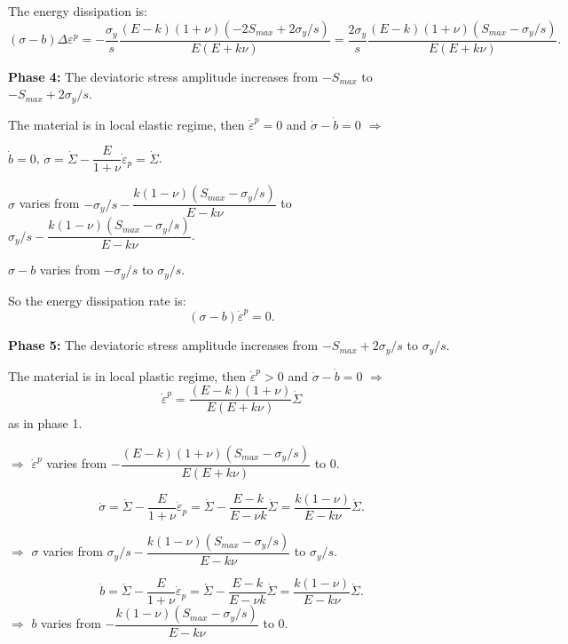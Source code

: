 \documentclass[3p,times,procedia,number]{elsarticle}
\begin{document}
\noindent
The energy dissipation is: $$(\sigma-b)\Delta\varepsilon^p=-\dfrac{\sigma_y}{s}\dfrac{(E- k)(1+\nu)(-2S_{max}+2\sigma_y/s)}{E(E+k\nu)}=\dfrac{2\sigma_y}{s}\dfrac{(E- k)(1+\nu)(S_{max}-\sigma_y/s)}{E(E+k\nu)}.$$



\vspace{6pt}
\noindent
\textbf{Phase 4:} The deviatoric stress amplitude increases from $-S_{max}$ to $-S_{max}+2\sigma_y/s$.

\noindent
The material is in local elastic regime, then $\dot{\varepsilon}^p=0$ and $\dot{\sigma}-\dot{b}=0$ $\Rightarrow$

\vspace{6pt}
\noindent
$\dot{b}=0$, $\dot{\sigma}=\dot{\Sigma}-\dfrac{E}{1+\nu}\dot{\varepsilon}_p=\dot{\Sigma}$.

\vspace{6pt}
\noindent
$\sigma$ varies from $-\sigma_y/s-\dfrac{k(1-\nu)(S_{max}-\sigma_y/s)}{E-k\nu}$ to $\sigma_y/s-\dfrac{k(1-\nu)(S_{max}-\sigma_y/s)}{E-k\nu}$.

\vspace{6pt}
\noindent
$\sigma-b$ varies from $-\sigma_y/s$ to $\sigma_y/s$.

\vspace{6pt}
\noindent
So the energy dissipation rate is: $$(\sigma-b)\dot{\varepsilon}^p=0.$$


\vspace{6pt}
\noindent
\textbf{Phase 5:} The deviatoric stress amplitude increases from $-S_{max}+2\sigma_y/s$ to $\sigma_y/s$.

\noindent
The material is in local plastic regime, then $\dot{\varepsilon}^p>0$ and $\dot{\sigma}-\dot{b}=0$ $\Rightarrow$ 
$$\dot{\varepsilon}^p=\dfrac{(E- k)(1+\nu)}{E(E+k\nu)}\dot{\Sigma}$$ as in phase 1.

\vspace{6pt}
\noindent
$\Rightarrow$ $\dot{\varepsilon}^p$ varies from $-\dfrac{(E- k)(1+\nu)(S_{max}-\sigma_y/s)}{E(E+k\nu)}$ to $0$.

\vspace{6pt}
$$\dot{\sigma}=\dot{\Sigma}-\dfrac{E}{1+\nu}\dot{\varepsilon}_p=\dot{\Sigma}-\dfrac{E-k}{E-\nu k}\dot{\Sigma}=\dfrac{k(1-\nu)}{E-k\nu}\dot{\Sigma}.$$

\vspace{6pt}
\noindent
$\Rightarrow$ $\sigma$ varies from $\sigma_y/s-\dfrac{k(1-\nu)(S_{max}-\sigma_y/s)}{E-k\nu}$ to $\sigma_y/s$.

\vspace{6pt}
$$\dot{b}=\dot{\Sigma}-\dfrac{E}{1+\nu}\dot{\varepsilon}_p=\dot{\Sigma}-\dfrac{E-k}{E-\nu k}\dot{\Sigma}=\dfrac{k(1-\nu)}{E-k\nu}\dot{\Sigma}.$$
\vspace{6pt}
\noindent
$\Rightarrow$ $b$ varies from $-\dfrac{k(1-\nu)(S_{max}-\sigma_y/s)}{E-k\nu}$ to $0$.
\end{document}
